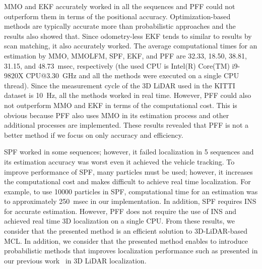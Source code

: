 \documentclass[letterpaper, 10 pt, conference]{ieeeconf}  %
\begin{document}
MMO and EKF accurately worked in all the sequences and PFF could not outperform them in terms of the positional accuracy.
Optimization-based methods are typically accurate more than probabilistic approaches and the results also showed that.
Since odometry-less EKF tends to similar to results by scan matching, it also accurately worked.
The average computational times for an estimation by MMO, MMOLFM, SPF, EKF, and PFF are 32.33, 18.50, 38.81, 31.15, and 48.73~msec, respectively (the used CPU is Intel(R) Core(TM) i9-9820X CPU@3.30~GHz and all the methods were executed on a single CPU thread).
Since the measurement cycle of the 3D LiDAR used in the KITTI dataset is 10~Hz, all the methods worked in real time.
However, PFF could also not outperform MMO and EKF in terms of the computational cost.
This is obvious because PFF also uses MMO in its estimation process and other additional processes are implemented.
These results revealed that PFF is not a better method if we focus on only accuracy and efficiency.

\begin{comment}
However, PFF achieved vehicle tracking in all the sequences despite SPF failed localization in some sequences.
To achieve more accurate and robust localization by SPF, many particles must be used and it increases the computational time.
If we focus on only accuracy, PFF is not suitable; however, solving the 3D localization problem with PF yields different advantage.
Hence, we consider that the presented method enables to introduce probabilistic methods that improves localization performance such as presented in our previous work~\cite{AkaiJFR2023} in 3D LiDAR localization.
We will discuss about its effectiveness in Section~\ref{subsec:discussion}.
\end{comment}

SPF worked in some sequences; however, it failed localization in 5 sequences and its estimation accuracy was worst even it achieved the vehicle tracking.
To improve performance of SPF, many particles must be used; however, it increases the computational cost and makes difficult to achieve real time localization.
For example, to use 10000 particles in SPF, computational time for an estimation was to approximately 250~msec in our implementation.
In addition, SPF requires INS for accurate estimation.
However, PFF does not require the use of INS and achieved real time 3D localization on a single CPU.
From these results, we consider that the presented method is an efficient solution to 3D-LiDAR-based MCL.
In addition, we consider that the presented method enables to introduce probabilistic methods that improves localization performance such as presented in our previous work~\cite{AkaiJFR2023} in 3D LiDAR localization.
\end{document}

